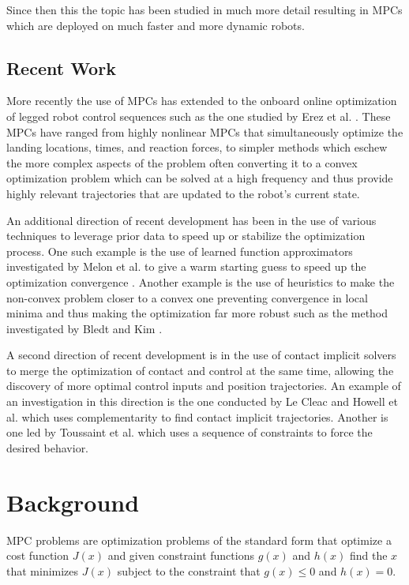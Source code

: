 \documentclass[conference]{IEEEtran}
\begin{document}
Since then this the topic has been studied in much more detail resulting in MPCs which are deployed on much faster and more dynamic robots.

\subsection{Recent Work}

More recently the use of MPCs has extended to the onboard online optimization of legged robot control sequences such as the one studied by Erez et al. \cite{erez_integrated_2013}.
These MPCs have ranged from highly nonlinear MPCs that simultaneously optimize the landing locations, times, and reaction forces, to simpler methods which eschew the more complex aspects of the problem often converting it to a convex optimization problem which can be solved at a high frequency and thus provide highly relevant trajectories that are updated to the robot's current state.

An additional direction of recent development has been in the use of various techniques to leverage prior data to speed up or stabilize the optimization process.
One such example is the use of learned function approximators investigated by Melon et al. to give a warm starting guess to speed up the optimization convergence \cite{melon_receding-horizon_2021}.
Another example is the use of heuristics to make the non-convex problem closer to a convex one preventing convergence in local minima and thus making the optimization far more robust such as the method investigated by Bledt and Kim \cite{bledt_extracting_2020}.

A second direction of recent development is in the use of contact implicit solvers to merge the optimization of contact and control at the same time, allowing the discovery of more optimal control inputs and position trajectories.
An example of an investigation in this direction is the one conducted by Le Cleac and Howell et al. \cite{cleach_fast_2023} which uses complementarity to find contact implicit trajectories.
Another is one led by Toussaint et al. \cite{toussaint_sequence--constraints_2022} which uses a sequence of constraints to force the desired behavior.

\section{Background}
\label{sec:background}

MPC problems are optimization problems of the standard form that optimize a cost function \(J(x)\) and given constraint functions \(g(x)\) and \(h(x)\) find the \(x\) that minimizes \(J(x)\) subject to the constraint that \(g(x)\leq0\) and \(h(x)=0\).
\end{document}
